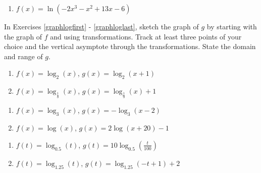 \documentclass{ximera}
\begin{document}
\begin{multicols}{2}
\begin{enumerate}
\setcounter{enumi}{\value{HW}}

\item $f(x) = \ln(-2x^{3} - x^{2} + 13x - 6)$  \label{domainloglast}

\setcounter{HW}{\value{enumi}}
\end{enumerate}
\end{multicols}


In Exercises \ref{graphlogfirst} - \ref{graphloglast}, sketch the graph of $g$ by starting with the graph of $f$ and using transformations.  Track at least three points of your choice and the vertical asymptote through the transformations. State the domain and range of $g$.


\begin{multicols}{2}
\begin{enumerate}
\setcounter{enumi}{\value{HW}}

\item  $f(x) = \log_{2}(x)$, $g(x) = \log_{2}(x+1)$ \label{graphlogfirst}

\item  $f(x) = \log_{\frac{1}{3}}(x)$, $g(x) = \log_{\frac{1}{3}}(x)+1$

\setcounter{HW}{\value{enumi}}
\end{enumerate}
\end{multicols}

\begin{multicols}{2}
\begin{enumerate}
\setcounter{enumi}{\value{HW}}


\item  $f(x) = \log_{3}(x)$, $g(x) = -\log_{3}(x-2)$

\item  $f(x) = \log(x)$, $g(x) = 2\log(x+20) -1$  

\setcounter{HW}{\value{enumi}}
\end{enumerate}
\end{multicols}

\begin{multicols}{2}
\begin{enumerate}
\setcounter{enumi}{\value{HW}}

\item  $f(t) = \log_{0.5}(t)$, $g(t) = 10 \log_{0.5}\left(\frac{t}{100}\right)$

\item  $f(t) = \log_{1.25}(t)$, $g(t) = \log_{1.25}(-t+1) + 2$

\setcounter{HW}{\value{enumi}}
\end{enumerate}
\end{multicols}
\end{document}
